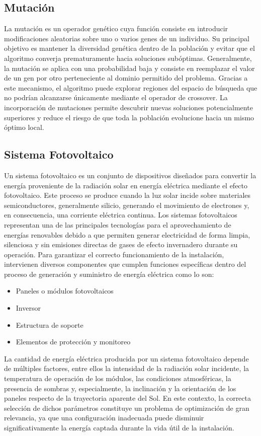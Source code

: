 \documentclass[12pt, a4paper]{article}
\begin{document}
\subsection{Mutación}
La mutación es un operador genético cuya función consiste en introducir modificaciones aleatorias sobre uno o varios genes de un individuo. Su principal objetivo es mantener la diversidad genética dentro de la población y evitar que el algoritmo converja prematuramente hacia soluciones subóptimas.
Generalmente, la mutación se aplica con una probabilidad baja y consiste en reemplazar el valor de un gen por otro perteneciente al dominio permitido del problema. Gracias a este mecanismo, el algoritmo puede explorar regiones del espacio de búsqueda que no podrían alcanzarse únicamente mediante el operador de crossover.
La incorporación de mutaciones permite descubrir nuevas soluciones potencialmente superiores y reduce el riesgo de que toda la población evolucione hacia un mismo óptimo local.

\subsection{Sistema Fotovoltaico}
Un sistema fotovoltaico es un conjunto de dispositivos diseñados para convertir la energía proveniente de la radiación solar en energía eléctrica mediante el efecto fotovoltaico. Este proceso se produce cuando la luz solar incide sobre materiales semiconductores, generalmente silicio, generando el movimiento de electrones y, en consecuencia, una corriente eléctrica continua.
Los sistemas fotovoltaicos representan una de las principales tecnologías para el aprovechamiento de energías renovables debido a que permiten generar electricidad de forma limpia, silenciosa y sin emisiones directas de gases de efecto invernadero durante su operación.
Para garantizar el correcto funcionamiento de la instalación, intervienen diversos componentes que cumplen funciones específicas dentro del proceso de generación y suministro de energía eléctrica como lo son:
\begin{itemize}
    \item Paneles o módulos fotovoltaicos
    \item Inversor
    \item Estructura de soporte
    \item Elementos de protección y monitoreo
\end{itemize}
La cantidad de energía eléctrica producida por un sistema fotovoltaico depende de múltiples factores, entre ellos la intensidad de la radiación solar incidente, la temperatura de operación de los módulos, las condiciones atmosféricas, la presencia de sombras y, especialmente, la inclinación y la orientación de los paneles respecto de la trayectoria aparente del Sol.
En este contexto, la correcta selección de dichos parámetros constituye un problema de optimización de gran relevancia, ya que una configuración inadecuada puede disminuir significativamente la energía captada durante la vida útil de la instalación.
\end{document}
